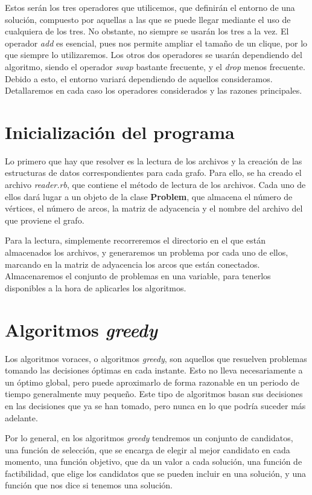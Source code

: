 Estos serán los tres operadores que utilicemos, que definirán el entorno de una solución, compuesto por
aquellas a las que se puede llegar mediante el uso de cualquiera de los tres. No obstante, no siempre se
usarán los tres a la vez. El operador \textit{add} es esencial, pues nos permite ampliar el tamaño de un clique,
por lo que siempre lo utilizaremos. Los otros dos operadores se usarán dependiendo del algoritmo, siendo el operador
\textit{swap} bastante frecuente, y el \textit{drop} menos frecuente. Debido a esto, el entorno variará dependiendo de
aquellos consideramos. Detallaremos en cada caso los operadores considerados y las razones principales.

\section{Inicialización del programa}
Lo primero que hay que resolver es la lectura de los archivos y la creación de las estructuras de datos correspondientes
para cada grafo. Para ello, se ha creado el archivo \textit{reader.rb}, que contiene el método de lectura de los archivos.
Cada uno de ellos dará lugar a un objeto de la clase \textbf{Problem}, que almacena el número de vértices, el número de
arcos, la matriz de adyacencia y el nombre del archivo del que proviene el grafo.

Para la lectura, simplemente recorreremos el directorio en el que están almacenados los archivos, y generaremos un problema
por cada uno de ellos, marcando en la matriz de adyacencia los arcos que están conectados. Almacenaremos el conjunto de problemas
en una variable, para tenerlos disponibles a la hora de aplicarles los algoritmos. 

\section{Algoritmos \textit{greedy}}

Los algoritmos voraces, o algoritmos \textit{greedy}, son aquellos que resuelven problemas tomando
las decisiones óptimas en cada instante. Esto no lleva necesariamente a un óptimo global, pero puede
aproximarlo de forma razonable en un periodo de tiempo generalmente muy pequeño. Este tipo de algoritmos
basan sus decisiones en las decisiones que ya se han tomado, pero nunca en lo que podría suceder más
adelante.

Por lo general, en los algoritmos \textit{greedy} tendremos un conjunto de candidatos, una función
de selección, que se encarga de elegir al mejor candidato en cada momento, una función objetivo, que
da un valor a cada solución, una función de factibilidad, que elige los candidatos que se pueden incluir
en una solución, y una función que nos dice si tenemos una solución.

